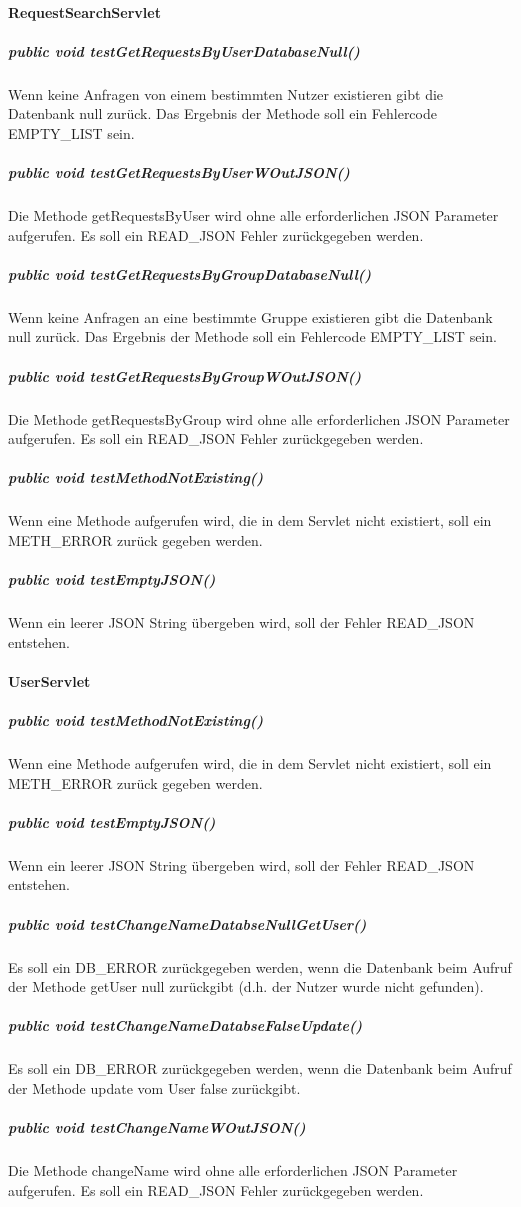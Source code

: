 \documentclass{scrartcl}
\begin{document}
\paragraph{RequestSearchServlet}
\subparagraph{public void testGetRequestsByUserDatabaseNull()}
Wenn keine Anfragen von einem bestimmten Nutzer existieren gibt die Datenbank null zurück. Das Ergebnis der Methode soll ein Fehlercode EMPTY\_LIST sein.
\subparagraph{public void testGetRequestsByUserWOutJSON()}
Die Methode getRequestsByUser wird ohne alle erforderlichen JSON Parameter aufgerufen. Es soll ein READ\_JSON Fehler zurückgegeben werden.
\subparagraph{public void testGetRequestsByGroupDatabaseNull()}
Wenn keine Anfragen an eine bestimmte Gruppe existieren gibt die Datenbank null zurück. Das Ergebnis der Methode soll ein Fehlercode EMPTY\_LIST sein.
\subparagraph{public void testGetRequestsByGroupWOutJSON()}
Die Methode getRequestsByGroup wird ohne alle erforderlichen JSON Parameter aufgerufen. Es soll ein READ\_JSON Fehler zurückgegeben werden.
\subparagraph{public void testMethodNotExisting()}
Wenn eine Methode aufgerufen wird, die in dem Servlet nicht existiert, soll ein METH\_ERROR zurück gegeben werden.
\subparagraph{public void testEmptyJSON()}
Wenn ein leerer JSON String übergeben wird, soll der Fehler READ\_JSON entstehen.

\paragraph{UserServlet}
\subparagraph{public void testMethodNotExisting()} 
Wenn eine Methode aufgerufen wird, die in dem Servlet nicht existiert, soll ein METH\_ERROR zurück gegeben werden.
\subparagraph{public void testEmptyJSON()}
Wenn ein leerer JSON String übergeben wird, soll der Fehler READ\_JSON entstehen.
\subparagraph{public void testChangeNameDatabseNullGetUser()}
Es soll ein DB\_ERROR zurückgegeben werden, wenn die Datenbank beim Aufruf der Methode getUser null zurückgibt (d.h. der Nutzer wurde nicht gefunden).
\subparagraph{public void testChangeNameDatabseFalseUpdate()}
Es soll ein DB\_ERROR zurückgegeben werden, wenn die Datenbank beim Aufruf der Methode update vom User false zurückgibt.
\subparagraph{public void testChangeNameWOutJSON()}
Die Methode changeName wird ohne alle erforderlichen JSON Parameter aufgerufen. Es soll ein READ\_JSON Fehler zurückgegeben werden.
\end{document}
